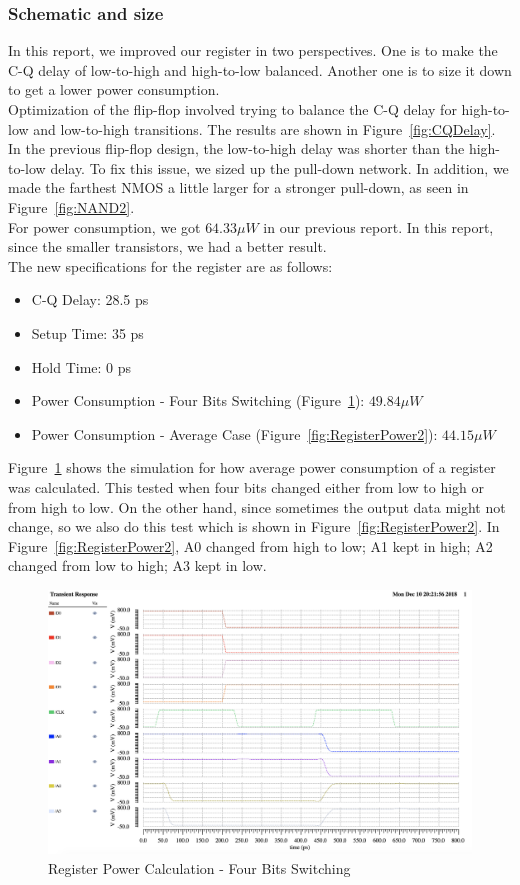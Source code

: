 \documentclass[10pt,letterpaper,onecolumn]{article}
\begin{document}
\subsubsection{Schematic and size}
In this report, we improved our register in two perspectives. One is to make the C-Q delay of low-to-high and high-to-low balanced. Another one is to size it down to get a lower power consumption.\\
Optimization of the flip-flop involved trying to balance the C-Q delay for high-to-low and low-to-high transitions. The results are shown in Figure~\ref{fig:CQDelay}. In the previous flip-flop design, the low-to-high delay was shorter than the high-to-low delay. To fix this issue, we sized up the pull-down network. In addition, we made the farthest NMOS a little larger for a stronger pull-down, as seen in Figure~\ref{fig:NAND2}.\\
For power consumption, we got $64.33 \mu W$ in our previous report. In this report, since the smaller transistors, we had a better result. \\
The new specifications for the register are as follows:
\begin{itemize}
  \item C-Q Delay: 28.5 ps
  \item Setup Time: 35 ps
  \item Hold Time: 0 ps
  \item Power Consumption - Four Bits Switching (Figure~\ref{fig:RegisterPower1}): $49.84 \mu W$
  \item Power Consumption - Average Case (Figure~\ref{fig:RegisterPower2}): $44.15 \mu W$
\end{itemize}

Figure~\ref{fig:RegisterPower1} shows the simulation for how average power consumption of a register was calculated. This tested when four bits changed either from low to high or from high to low. On the other hand, since sometimes the output data might not change, so we also do this test which is shown in Figure~\ref{fig:RegisterPower2}. In Figure~\ref{fig:RegisterPower2}, A0 changed from high to low; A1 kept in high; A2 changed from low to high; A3 kept in low.

\begin{figure}[h!]
\centering
\includegraphics[clip,width=\columnwidth]{RegisterPower.png}
\caption{Register Power Calculation - Four Bits Switching}
\label{fig:RegisterPower1}
\end{figure}
\end{document}
